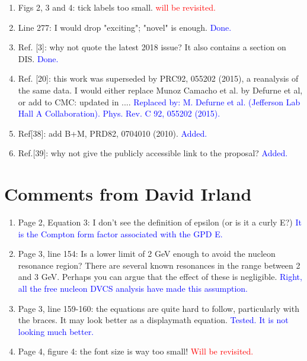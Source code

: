 \documentclass[a4paper,11pt,twoside]{article}
\begin{document}
\begin{enumerate}
   \item Figs 2, 3 and 4: tick labels too small.
\textcolor{red}{will be revisited.}

   \item Line 277: I would drop "exciting"; "novel" is enough.
\textcolor{blue}{Done.}

   \item Ref. [3]: why not quote the latest 2018 issue? It also contains a 
      section on DIS.
\textcolor{blue}{Done.}

   \item Ref. [20]: this work was superseded by PRC92, 055202 (2015), a 
      reanalysis of the same data. I would either replace Munoz Camacho et al.  
      by Defurne et al, or add to CMC: updated in ....
      \textcolor{blue}{Replaced by: M. Defurne et al. (Jefferson Lab Hall A 
      Collaboration). Phys. Rev. C 92, 055202 (2015).}

   \item Ref[38]: add B+M, PRD82, 0704010 (2010).
\textcolor{blue}{Added.}

   \item Ref.[39]: why not give the publicly accessible link to the proposal?
   \textcolor{blue}{Added.}
  
\end{enumerate}



\section{Comments from David Irland}


\begin{enumerate}

\item Page 2, Equation 3: I don't see the definition of epsilon (or is it a 
   curly E?)
\textcolor{blue}{It is the Compton form factor associated with the GPD E.}

\item Page 3, line 154: Is a lower limit of 2 GeV enough to avoid the nucleon 
   resonance region? There are several known resonances in the range between 2 
      and 3 GeV. Perhaps you can argue that the effect of these is negligible.
\textcolor{blue}{Right, all the free nucleon DVCS analysis have made this 
      assumption.}

\item Page 3, line 159-160: the equations are quite hard to follow, 
   particularly with the braces. It may look better as a displaymath equation.
\textcolor{blue}{Tested. It is not looking much better.}

\item Page 4, figure 4: the font size is way too small!  \textcolor{red}{Will 
   be revisited.}
  
\end{enumerate}
\end{document}
